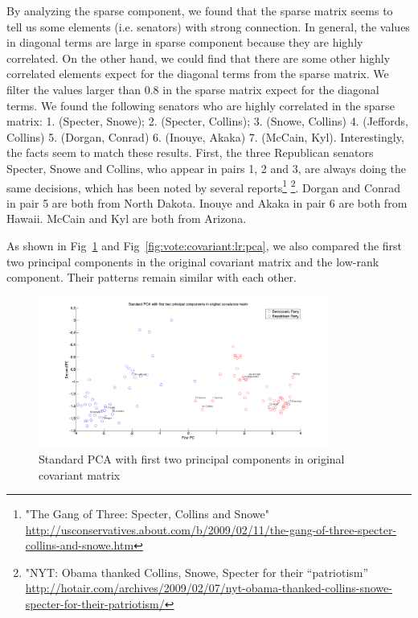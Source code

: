By analyzing the sparse component, we found that the sparse matrix seems to tell us some elements (i.e. senators) with strong connection. In general, the values in diagonal terms are large in sparse component because they are highly correlated. On the other hand, we could find that there are some other highly correlated elements expect for the diagonal terms from the sparse matrix. We filter the values larger than 0.8 in the sparse matrix expect for the diagonal terms. We found the following senators who are highly correlated in the sparse matrix: 1. (Specter, Snowe); 2. (Specter, Collins); 3. (Snowe, Collins) 4. (Jeffords, Collins) 5. (Dorgan, Conrad) 6. (Inouye, Akaka) 7. (McCain, Kyl). Interestingly, the facts seem to match these results. First, the three Republican senators Specter, Snowe and Collins, who appear in pairs 1, 2 and 3, are always doing the same decisions, which has been noted by several reports\footnote{"The Gang of Three: Specter, Collins and Snowe" \url{http://usconservatives.about.com/b/2009/02/11/the-gang-of-three-specter-collins-and-snowe.htm}} \footnote{"NYT: Obama thanked Collins, Snowe, Specter for their “patriotism” \url{http://hotair.com/archives/2009/02/07/nyt-obama-thanked-collins-snowe-specter-for-their-patriotism/}}. Dorgan and Conrad in pair 5 are both from North Dakota. Inouye and Akaka in pair 6 are both from Hawaii. McCain and Kyl are both from Arizona. 

As shown in Fig~\ref{fig:vote:covariant:pca} and Fig~\ref{fig:vote:covariant:lr:pca}, we also compared the first two principal components in the original covariant matrix and the low-rank component. Their patterns remain similar with each other.  

\begin{figure}[h]
  \centering
  \includegraphics[width=0.85\textwidth]{../figures/vote_cov_mat_pca.pdf}
  \caption{Standard PCA with first two principal components in original covariant matrix}
  \label{fig:vote:covariant:pca}
\end{figure}

